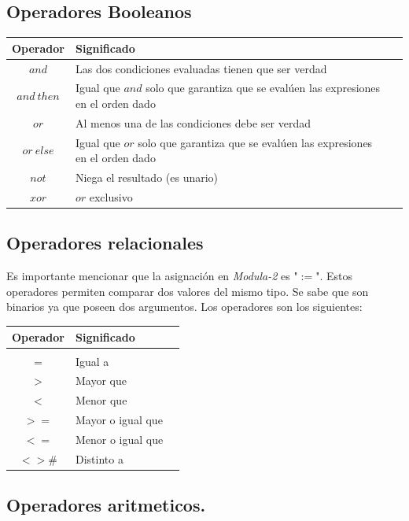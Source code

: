 \documentclass[10pt,journal,compsoc]{IEEEtran}
\begin{document}
\subsection{Operadores Booleanos}
\begin{tabular}{c p{6cm} p{15cm}}
	Operador & Significado\\
	\hline\hline
	$and$ & Las dos condiciones evaluadas tienen que ser verdad\\\hline
	$and~then$ & Igual que $and$ solo que garantiza que se eval\'uen las expresiones en el orden dado\\\hline
	$or$ & Al menos una de las condiciones debe ser verdad\\\hline
	$or~else$ & Igual que $or$ solo que garantiza que se eval\'uen las expresiones en el orden dado\\\hline
	$not$ & Niega el resultado (es unario)\\\hline
	$xor$ & $or$ exclusivo\\ 
	\hline 
\end{tabular}

\subsection{Operadores relacionales}
Es importante mencionar que la asignaci\'on en \emph{Modula-2} es "$:=$". Estos operadores permiten comparar dos valores del mismo tipo. Se sabe que son binarios ya que poseen dos argumentos. Los operadores son los siguientes: \newline\newline
\begin{tabular}{c p{3cm} p{5cm}}
	Operador & Significado\\
	\hline\hline\\
	$=$ & Igual a\\
	$>$ & Mayor que\\
	$<$ & Menor que\\
	$>=$ & Mayor o igual que\\
	$<=$ &Menor o igual que\\
	$<> \#$ & Distinto a\\
	\hline
\end{tabular}

\subsection{Operadores aritmeticos.}
\end{document}
